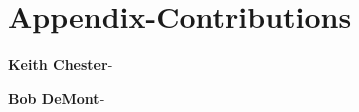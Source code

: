 \documentclass{article}
\begin{document}
\begin{multicols}{2}
\begin{thebibliography}{10}
\end{thebibliography}
\pagebreak
\section*{Appendix-Contributions}
\noindent \textbf{Keith Chester}-  
\bigskip

\noindent \textbf{Bob DeMont}- 

\end{multicols}
\end{document}
